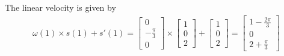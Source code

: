 \documentclass{article}
\begin{document}
\begin{enumerate}
\begin{enumerate}
      The linear velocity is given by
      \begin{align*}
       \omega(1) \times s(1) + s'(1) = \begin{bmatrix}
                             0 \\ -\frac{\pi}{3} \\ 0
                            \end{bmatrix} \times \begin{bmatrix}
                             1 \\ 0 \\ 2
                            \end{bmatrix} + \begin{bmatrix}
                             1 \\ 0 \\ 2
                            \end{bmatrix} = \begin{bmatrix}
                            1-\frac{2\pi}{3} \\ 0 \\ 2+ \frac{\pi}{3}
                            \end{bmatrix}
      \end{align*}

      

\end{enumerate}
\end{enumerate}
\end{document}
